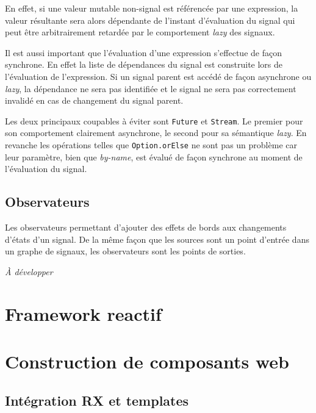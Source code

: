 En effet, si une valeur mutable non-signal est référencée par une expression, la valeur résultante sera alors dépendante de l'instant d'évaluation du signal qui peut être arbitrairement retardée par le comportement \emph{lazy} des signaux.

Il est aussi important que l'évaluation d'une expression s'effectue de façon synchrone. En effet la liste de dépendances du signal est construite lors de l'évaluation de l'expression. Si un signal parent est accédé de façon asynchrone ou \emph{lazy}, la dépendance ne sera pas identifiée et le signal ne sera pas correctement invalidé en cas de changement du signal parent.

Les deux principaux coupables à éviter sont \texttt{Future} et \texttt{Stream}. Le premier pour son comportement clairement asynchrone, le second pour sa sémantique \emph{lazy}. En revanche les opérations telles que \texttt{Option.orElse} ne sont pas un problème car leur paramètre, bien que \emph{by-name}, est évalué de façon synchrone au moment de l'évaluation du signal.

\subsection{Observateurs} \label{sec:sig-obs}

Les observateurs permettant d'ajouter des effets de bords aux changements d'états d'un signal. De la même façon que les sources sont un point d'entrée dans un graphe de signaux, les observateurs sont les points de sorties.

\textit{À développer}

\section{Framework reactif}

\section{Construction de composants web}
\subsection{Intégration RX et templates}